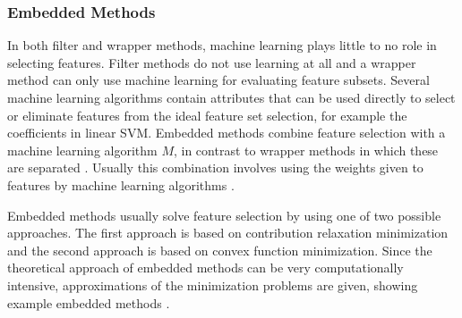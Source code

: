 \documentclass[10pt,a4paper]{report}
\begin{document}
	\subsubsection{Embedded Methods}
	\label{FSsubsec:EmbeddedMethods}
	
	In both filter and wrapper methods, machine learning plays little to no role in selecting features. Filter methods do not use learning at all and a wrapper method can only use machine learning for evaluating feature subsets. Several machine learning algorithms contain attributes that can be used directly to select or eliminate features from the ideal feature set selection, for example the coefficients in linear SVM. Embedded methods combine feature selection with a machine learning algorithm $M$, in contrast to wrapper methods in which these are separated \cite{Lal2006}. Usually this combination involves using the weights given to features by machine learning algorithms \cite{blum1997selection}.
	
	Embedded methods usually solve feature selection by using one of two possible approaches. The first approach is based on contribution relaxation minimization and the second approach is based on convex function minimization. Since the theoretical approach of embedded methods can be very computationally intensive, approximations of the minimization problems are given, showing example embedded methods \cite{Lal2006}.
	
\end{document}
